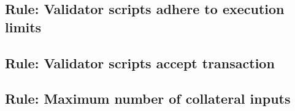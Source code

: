 \documentclass[../midgard.tex]{subfiles}
\begin{document}
\subsection{Rule: Validator scripts adhere to execution limits}
\label{rule:validator-scripts-adhere-to-execution-limits}


\subsection{Rule: Validator scripts accept transaction}
\label{rule:validator-scripts-accept-transaction}


\subsection{Rule: Maximum number of collateral inputs}
\label{rule:maximum-number-of-collateral-inputs}

\end{document}
